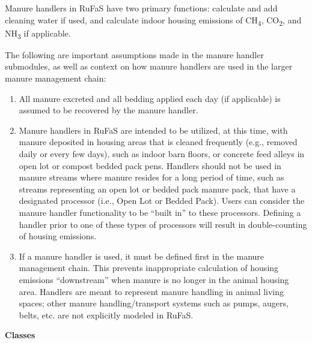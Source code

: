 \begin{refsection}
\begin{itemize}
    \end{itemize}




Manure handlers in RuFaS have two primary functions: calculate and add cleaning water if used, and calculate indoor housing emissions of CH\textsubscript{4}, CO\textsubscript{2}, and NH\textsubscript{3} if applicable.
\vspace{0.2cm}

    The following are important assumptions made in the manure handler submodules, as well as context on how manure handlers are used in the larger manure management chain:
    \begin{enumerate}
        \item All manure excreted and all bedding applied each day (if applicable) is assumed to be recovered by the manure handler. 
        \item Manure handlers in RuFaS are intended to be utilized, at this time, with manure deposited in housing areas that is cleaned frequently (e.g., removed daily or every few days), such as indoor barn floors, or concrete feed alleys in open lot or compost bedded pack pens. Handlers should not be used in manure streams where manure resides for a long period of time, such as streams representing an open lot or bedded pack manure pack, that have a designated processor (i.e., Open Lot or Bedded Pack). Users can consider the manure handler functionality to be “built in” to these processors. Defining a handler prior to one of these types of processors will result in double-counting of housing emissions. 
        \item If a manure handler is used, it must be defined first in the manure management chain. This prevents inappropriate calculation of housing emissions “downstream” when manure is no longer in the animal housing area. Handlers are meant to represent manure handling in animal living spaces; other manure handling/transport systems such as pumps, augers, belts, etc. are not explicitly modeled in RuFaS. 
    \end{enumerate}

\newpage
\textbf{Classes}
\vspace{ 0.25cm}

    \begin{table}[h!]
    \begin{center}
        \caption{The classes of handlers that are used in this module.}
    \end{center}
\vspace{ -0.5cm}


\end{table}
\end{refsection}
